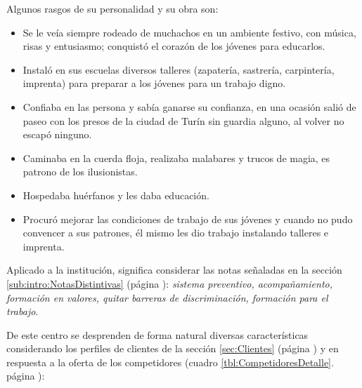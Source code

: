 Algunos rasgos de su personalidad y su obra son:

\begin{itemize}
	\item Se le veía siempre rodeado de muchachos en un ambiente festivo, con música, risas y entusiasmo; conquistó el corazón de los jóvenes para educarlos.
	\item Instaló en sus escuelas diversos talleres (zapatería, sastrería, carpintería, imprenta) para preparar a los jóvenes para un trabajo digno.
	\item Confiaba en las persona y sabía ganarse su confianza, en una ocasión salió de paseo con los presos de la ciudad de Turín sin guardia alguno, al volver no escapó ninguno.
	\item Caminaba en la cuerda floja, realizaba malabares y trucos de magia, es patrono de los ilusionistas.
	\item Hospedaba huérfanos y les daba educación.
	\item Procuró mejorar las condiciones de trabajo de sus jóvenes y cuando no pudo convencer a sus patrones, él mismo les dio trabajo instalando talleres e imprenta.
\end{itemize}

Aplicado a la institución, significa considerar las notas señaladas en la sección \ref{sub:intro:NotasDistintivas} (página \pageref{sub:intro:NotasDistintivas}): \emph{sistema preventivo, acompañamiento, formación en valores, quitar barreras de discriminación, formación para el trabajo}.

De este centro se desprenden de forma natural diversas características considerando los perfiles de clientes de la sección \ref{sec:Clientes} (página \pageref{sec:Clientes}) y en respuesta a la oferta de los competidores (cuadro \ref{tbl:CompetidoresDetalle}. p\'agina \pageref{tbl:CompetidoresDetalle}):

